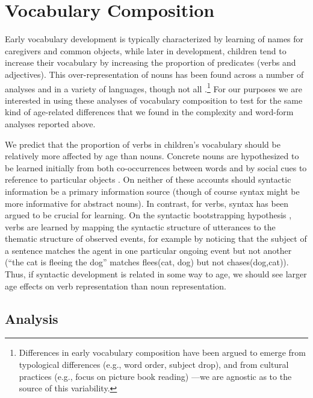 \documentclass[10pt,letterpaper]{article}
\begin{document}
\section{Vocabulary Composition}

Early vocabulary development is typically characterized by learning of names for caregivers and common objects, while later in development, children tend to increase their vocabulary by increasing the proportion of predicates (verbs and adjectives). This over-representation of nouns has been found across a number of analyses and in a variety of languages, though not all \cite{caselli1995}.\footnote{Differences in early vocabulary composition have been argued to emerge from typological differences (e.g., word order, subject drop), and from cultural practices (e.g., focus on picture book reading) \cite{tardif1999, gopnik1996, choi1995}---we are agnostic as to the source of this variability.} For our purposes we are interested in using these analyses of vocabulary composition to test for the same kind of age-related differences that we found in the complexity and word-form analyses reported above. 

We predict that the proportion of verbs in children's vocabulary should be relatively more affected by age than nouns. Concrete nouns are hypothesized to be learned initially from both co-occurrences between words \cite{yu2007b} and by social cues to reference to particular objects \cite{bloom2002}. On neither of these accounts should syntactic information be a primary information source (though of course syntax might be more informative for abstract nouns). In contrast, for verbs, syntax has been argued to be crucial for learning. On the syntactic bootstrapping hypothesis \cite{gleitman1990,fisher1991}, verbs are learned by  mapping the syntactic structure of utterances to the thematic structure of observed events, for example by noticing that the subject of a sentence matches the agent in one particular ongoing event but not another (``the cat is fleeing the dog'' matches  {\sc flees(cat, dog)} but not {\sc chases(dog,cat)}). Thus, if syntactic development is related in some way to age, we should see larger age effects on verb representation than noun representation. 

\subsection{Analysis}
\end{document}
